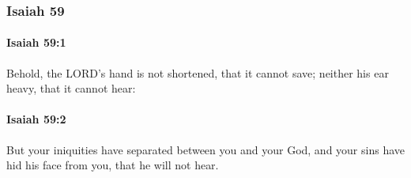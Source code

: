 	\subsubsection{Isaiah 59} %
		\label{ISAIAH-59}

		\paragraph{Isaiah 59:1} %
			\label{ISAIAH-59-1}

			Behold, the LORD's hand is not shortened, that it cannot save; neither his ear heavy, that it cannot hear:


		\paragraph{Isaiah 59:2} %
			\label{ISAIAH-59-2}

			But your iniquities have separated between you and your God, and your sins have hid his face from you, that he will not hear.

